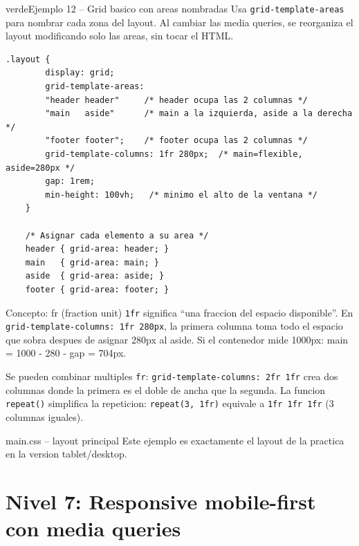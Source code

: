 \documentclass[11pt,a4paper]{article}
\begin{document}
	\begin{cajacodigo}{verde}{Ejemplo 12 -- Grid basico con areas nombradas}
		{\color{codigotexto}\small Usa \texttt{grid-template-areas} para nombrar cada zona del layout. Al cambiar las media queries, se reorganiza el layout modificando solo las areas, sin tocar el HTML.}
		\begin{lstlisting}[style=codecss]
	.layout {
		display: grid;
		grid-template-areas:
		"header header"     /* header ocupa las 2 columnas */
		"main   aside"      /* main a la izquierda, aside a la derecha */
		"footer footer";    /* footer ocupa las 2 columnas */
		grid-template-columns: 1fr 280px;  /* main=flexible, aside=280px */
		gap: 1rem;
		min-height: 100vh;   /* minimo el alto de la ventana */
	}
	
	/* Asignar cada elemento a su area */
	header { grid-area: header; }
	main   { grid-area: main; }
	aside  { grid-area: aside; }
	footer { grid-area: footer; } \end{lstlisting}
	\end{cajacodigo}
	
	\begin{cajaconcepto}{Concepto: fr (fraction unit)}
		\texttt{1fr} significa ``una fraccion del espacio disponible''. En \texttt{grid-template-columns: 1fr 280px}, la primera columna toma todo el espacio que sobra despues de asignar 280px al aside. Si el contenedor mide 1000px: main = 1000 - 280 - gap = 704px.
		
		Se pueden combinar multiples \texttt{fr}: \texttt{grid-template-columns: 2fr 1fr} crea dos columnas donde la primera es el doble de ancha que la segunda. La funcion \texttt{repeat()} simplifica la repeticion: \texttt{repeat(3, 1fr)} equivale a \texttt{1fr 1fr 1fr} (3 columnas iguales).
	\end{cajaconcepto}
	
	\begin{cajapractica}{main.css -- layout principal}
		Este ejemplo es exactamente el layout de la practica en la version tablet/desktop.
	\end{cajapractica}
	
	\section{Nivel 7: Responsive mobile-first con media queries}
	
\end{document}

